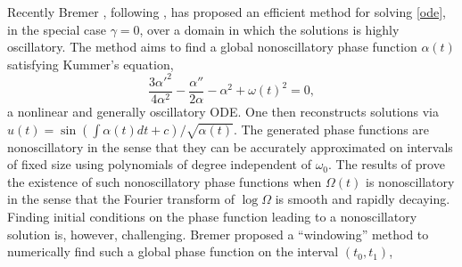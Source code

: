 \documentclass[10pt]{article}
\newcommand{\be}{\begin{equation}}
\newcommand{\ee}{\end{equation}}
\newcommand{\eg}{{\it e.g.\ }}
\newcommand{\bigO}{{\mathcal O}}
\newcommand{\om}{\omega}
\newcommand{\g}{\gamma}
\newcommand{\AB}[1]{{\color{orange}#1}}
\begin{document}
Recently Bremer \cite{bremer2018}, following \cite{heitman2015,bremer2016},
has proposed an efficient
method for solving \cref{ode}, in the special case $\g = 0$,
over a domain in which the solutions is highly oscillatory.
The method aims to find a global nonoscillatory phase function $\alpha(t)$
satisfying Kummer's equation,
\be
\frac{3 \alpha'^2}{4\alpha^2} - \frac{\alpha''}{2\alpha} - \alpha^2 +
\om(t)^2 = 0,
\label{kummer}
\ee
a nonlinear and generally oscillatory ODE.
%
One then reconstructs solutions
via $u(t) = \sin(\int \alpha(t) dt + c)/\sqrt{\alpha(t)}$.
%
%
The generated phase functions are nonoscillatory in the sense that they can be
accurately approximated on intervals of fixed size
using polynomials of degree independent of $\om_0$.
The results of \cite{heitman2015,bremer2016}
prove the existence of such nonoscillatory phase functions when
$\Omega(t)$ is
nonoscillatory in the sense that the Fourier transform of $\log \Omega$ is smooth
and rapidly decaying.
Finding initial conditions on the phase function leading to
a nonoscillatory solution is, however, challenging.
Bremer proposed a ``windowing'' method to numerically find such a global phase function on the interval $(t_0,t_1)$,
\end{document}
